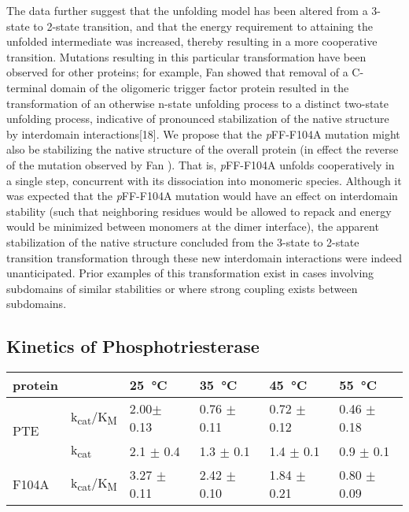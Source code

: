\begin{refsection}
The data further suggest that the unfolding model has been altered
from a 3-state to 2-state transition, and that the energy requirement to
attaining the unfolded intermediate was increased, thereby resulting in a more
cooperative transition. Mutations resulting in this particular transformation
have been observed for other proteins; for example, Fan  showed
that removal of a C-terminal domain of the oligomeric  trigger
factor protein resulted in the transformation of an otherwise n-state unfolding
process to a distinct two-state unfolding process, indicative of pronounced
stabilization of the native structure by interdomain interactions[18]. We
propose that the \emph{p}FF-F104A mutation might also be stabilizing the native
structure of the overall protein (in effect the reverse of the mutation
observed by Fan )\cite{Fan2008}. That is, \emph{p}FF-F104A unfolds
cooperatively in a single step, concurrent with its dissociation into monomeric
species. Although it was expected that the \emph{p}FF-F104A mutation would have an
effect on interdomain stability (such that neighboring residues would be
allowed to repack and energy would be minimized between monomers at the dimer
interface), the apparent stabilization of the native structure concluded from
the 3-state to 2-state transition transformation through these new interdomain
interactions were indeed unanticipated. Prior examples of this transformation
exist in cases involving subdomains of similar stabilities or where strong
coupling exists between subdomains\cite{Tsytlonok2013}.

\subsection{Kinetics of Phosphotriesterase}

\begin{table}[h!]
\centering
    \begin{tabular}{llllll}
    \hline
    protein                 &  & \SI{25}{\celsius} & \SI{35}{\celsius} &
    \SI{45}{\celsius} & \SI{55}{\celsius} \\ 
    \hline
    \multirow{2}{*}{PTE}    & k\textsubscript{cat}/K\textsubscript{M} & 2.00$
    \pm$ 0.13 & 0.76 $\pm$ 0.11 & 0.72 $\pm$ 0.12 & 0.46 $\pm$ 0.18 \\
    
    & k\textsubscript{cat} & 2.1 $\pm$ 0.4 & 1.3 $\pm$ 0.1 & 1.4 $\pm$ 0.1 & 0.9
    $\pm$ 0.1 \\
    \multirow{2}{*}{F104A}  & k\textsubscript{cat}/K\textsubscript{M} & 3.27
    $\pm$ 0.11 & 2.42 $\pm$ 0.10 & 1.84 $\pm$ 0.21 & 0.80 $\pm$ 0.09 \\ 
    

\end{tabular}
\end{table}
\end{refsection}
